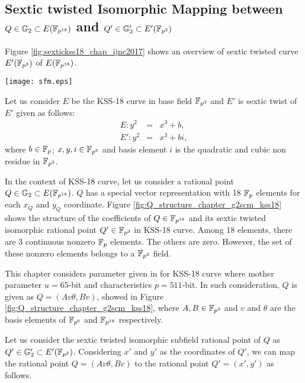 \subsection{Sextic twisted Isomorphic Mapping between \texorpdfstring{$Q \in {\mathbb{G}}_{2} \subset E(\mathbb{F}_{p^{18}})$}{} and \texorpdfstring{$Q' \in {\mathbb{G}}_{2}' \subset E'(\mathbb{F}_{p^3})$}{}}
Figure \ref{fig:sextickss18_chap_ijnc2017} shows an overview of sextic twisted curve $E'(\mathbb{F}_{p^3})$ of $E(\mathbb{F}_{p^{18}})$.
\begin{figure*}
\centering
\texttt{[image: sfm.eps]}
\caption{\textit{sextic twist} in KSS-18 curve.}
\label{fig:sextickss18_chap_ijnc2017}
\end{figure*}

Let us consider $E$ be the KSS-18 curve in base field $\mathbb{F}_{p^3}$  and $E'$ is sextic twist of $E'$ given as follows: 
\begin{eqnarray}
E:y^2 & = &x^3+b,\\
E':y^2 & = & x^3+bi, \label{eq:KSS18_Twist_chap_ijnc2017}
\end{eqnarray}
where $b \in {\mathbb{F}}_{p}$; $x, y, i \in \mathbb{F}_{p^3}$ and basis element $i$ is the quadratic and cubic non residue in $\mathbb{F}_{p^3}$.

In the context of KSS-18 curve, let us consider a rational point $Q\in {\mathbb{G}}_{2} \subset E({\mathbb{F}}_{p^{18}})$.
$Q$ has a  special vector representation with 18 ${\mathbb{F}}_{p}$ elements for each $x_Q$ and $y_Q$ coordinate.
Figure \ref{fig:Q_structure_chapter_g2scm_kss18} shows the structure of the coefficients of $Q \in \mathbb{F}_{p^{18}}$ and its sextic twisted isomorphic rational point $Q' \in \mathbb{F}_{p^3}$ in KSS-18 curve.
Among 18 elements, there are 3 continuous nonzero ${\mathbb{F}}_{p}$ elements. The others are zero.
However, the set of these nonzero elements belongs to a $\mathbb{F}_{p^3}$ field. 

This chapter considers parameter given in  for KSS-18 curve where mother parameter $u=65$-bit and characteristics $p=511$-bit. In such consideration, $Q$ is given as $Q = (Av\theta, Bv)$,  showed in Figure \ref{fig:Q_structure_chapter_g2scm_kss18}, where $A, B \in \mathbb{F}_{p^3}$ and $v$ and $\theta$ are the basis elements of ${\mathbb{F}}_{p^{6}}$ and $\mathbb{F}_{p^{18}}$ respectively. 

Let us consider the sextic twisted isomorphic subfield rational point of $Q$ as $Q' \in {\mathbb{G}}_{2}' \subset E'({\mathbb{F}}_{p^{3}})$.
Considering $x'$ and $y'$ as the coordinates of $Q'$, we can map the rational point $Q = (Av\theta, Bv)$  to the rational point  $Q' = (x',y')$ as follows.

